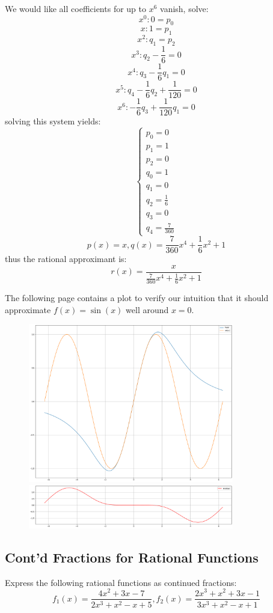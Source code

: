 \documentclass[12pt]{article} %
\newcommand{\1}[1]{\mathds{1}\left[#1\right]}
\begin{document}
We would like all coefficients for up to $x^6$ vanish, solve:
$$
	x^0: 0 = p_0
$$
$$
	x: 1 = p_1
$$
$$
	x^2: q_1 = p_2
$$
$$
	x^3: q_2-\frac16 = 0
$$
$$
	x^4: q_3-\frac16q_1 = 0
$$
$$
	x^5: q_4 -\frac16q_2+\frac{1}{120} = 0
$$
$$
	x^6: -\frac16q_3+\frac{1}{120}q_1 = 0
$$ solving this system yields:
$$
	\begin{cases}
		p_0 = 0\\
		p_1 = 1\\
		p_2 = 0\\
		q_0 = 1\\
		q_1 = 0\\
		q_2 = \frac16\\
		q_3 = 0\\
		q_4 = \frac{7}{360}
	\end{cases}
$$
$$
	p(x) =x,
	q(x) = \frac{7}{360}x^4 + \frac16x^2 + 1
$$ thus the rational approximant is:
$$
	r(x) = \frac{x}{\frac{7}{360}x^4 + \frac16x^2 + 1}
$$

The following page contains a plot to verify our intuition that it should approximate $f(x) = \sin(x)$ well around $x=0$.

\begin{figure}[h]
\centering
\includegraphics[width=0.8\textwidth]{p4PadePlot.png}
\includegraphics[width=0.8\textwidth]{p4PadeResidual.png}
\end{figure}


\newpage
\subsection{Cont'd Fractions for Rational Functions}
Express the following rational functions as continued fractions:
$$
	f_1(x) = \frac{4x^2 + 3x-7}{2x^3 + x^2- x +5}, f_2(x) = \frac{2x^3 +x^2 +3x-1}{3x^3 + x^2 - x+1}
$$
\end{document}

